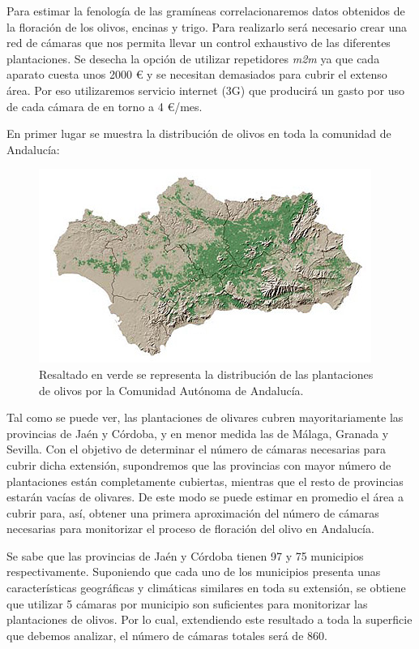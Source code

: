 \documentclass[12pt,oneside,a4paper]{article}
\numberwithin{figure}{section}
\begin{document}
Para estimar la fenología de las gramíneas correlacionaremos datos obtenidos de la floración de los olivos, encinas y trigo. Para realizarlo será necesario crear una red de cámaras que nos permita llevar un control exhaustivo de las diferentes plantaciones. Se desecha la opción de utilizar repetidores \textit{m2m} ya que cada aparato cuesta unos 2000 € y se necesitan demasiados para cubrir el extenso área. Por eso utilizaremos servicio internet (3G) que producirá un gasto por uso de cada cámara de en torno a 4 €/mes.

En primer lugar se muestra la distribución de olivos en toda la comunidad de Andalucía:

\begin{figure}[H]
\begin{center}
\includegraphics[scale=.9]{Apendice1.png}
\caption{Resaltado en verde se representa la distribución de las plantaciones de olivos por la Comunidad Autónoma de Andalucía.}
\end{center}
\end{figure}

Tal como se puede ver, las plantaciones de olivares cubren mayoritariamente las provincias de Jaén y Córdoba, y en menor medida las de Málaga, Granada y Sevilla. Con el objetivo de determinar el número de cámaras necesarias para cubrir dicha extensión, supondremos que las provincias con mayor número de plantaciones están completamente cubiertas, mientras que el resto de provincias estarán vacías de olivares. De este modo se puede estimar en promedio el área a cubrir para, así, obtener una primera aproximación del número de cámaras necesarias para monitorizar el proceso de floración del olivo en Andalucía.

Se sabe que las provincias de Jaén y Córdoba tienen 97 y 75 municipios respectivamente. Suponiendo que cada uno de los municipios presenta unas características geográficas y climáticas similares en toda su extensión, se obtiene que utilizar 5 cámaras por municipio son suficientes para monitorizar las plantaciones de olivos. Por lo cual, extendiendo este resultado a toda la superficie que debemos analizar, el número de cámaras totales será de 860.
\end{document}
